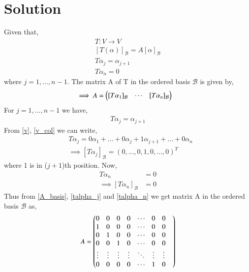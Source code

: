 \documentclass[journal,12pt,twocolumn]{IEEEtran}
\begin{document}
\section{Solution}
Given that, 
\begin{align}
    T: V \xrightarrow{} V \\
    [T(\alpha)]_\mathcal{B} = A[\alpha]_{\mathcal{B}} \\
    T\alpha_{j} = \alpha_{j+1} \\
    T\alpha_{n} = 0
\end{align}
where $j = 1,\ldots, n-1$. 
The matrix A of T in the ordered basis $\mathcal{B}$ is given by, 
\begin{align}
    \implies A &= \begin{pmatrix}[T\alpha_1]_{\mathcal{B}} & \cdots & [T\alpha_n]_{\mathcal{B}}\end{pmatrix} \label{A_basis}
\end{align}
For $j = 1,\ldots, n-1$ we have,
\begin{align}
    T\alpha_{j} = \alpha_{j+1}
\end{align}
From \eqref{v}, \eqref{v_col} we can write, 
\begin{align}
    &T\alpha_{j} = 0\alpha_{1} + \ldots + 0\alpha_{j} + 1\alpha_{j+1} + \ldots + 0\alpha_{n} \\
    &\implies [T\alpha_{j}]_{\mathcal{B}} = (0,\ldots,0, 1,0,\ldots, 0)^{T} \label{talpha_j}
\end{align}
where 1 is in ($j+1$)th position. Now,
\begin{align}
    T\alpha_{n} &= 0 \\
    \implies [T\alpha_{n}]_{\mathcal{B}} &= 0 \label{talpha_n}
\end{align}
Thus from \eqref{A_basis}, \eqref{talpha_j} and \eqref{talpha_n} we get matrix A in the ordered basis $\mathcal{B}$ as,
\begin{align}
    A = \begin{pmatrix}0&0&0&0&\cdots&0&0& \\ 1&0&0&0&\cdots&0&0 \\ 0&1&0&0&\cdots&0&0 \\ 0&0&1&0&\cdots&0&0 \\ \vdots&\vdots&\vdots&\vdots&\ddots&\vdots&\vdots \\ 0&0&0&0&\cdots&1&0\end{pmatrix}
\end{align}
\end{document}
